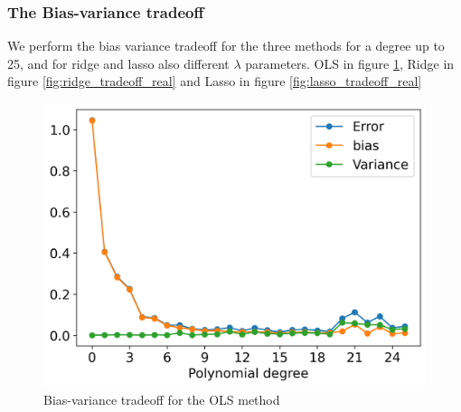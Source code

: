 \documentclass[12pt]{article}
\begin{document}
\subsubsection{The Bias-variance tradeoff}
We perform the bias variance tradeoff for the three methods for a degree up to 25, and for ridge and lasso also different $\lambda$ parameters. OLS in figure \ref{fig:tradeoff_real}, Ridge in figure \ref{fig:ridge_tradeoff_real} and Lasso in figure \ref{fig:lasso_tradeoff_real}
\begin{figure}[H]
  \centering
  \includegraphics[width=.4\textwidth]{../figures/ols_real_tradeoff.png}
  \caption{Bias-variance tradeoff for the OLS method}
  \label{fig:tradeoff_real}
\end{figure}
\end{document}
